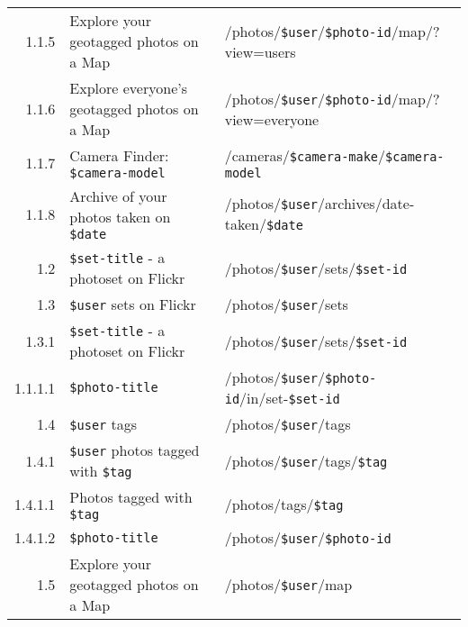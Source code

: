 \documentclass[11pt,a4paper]{article}
\newcommand{\var}[1]{\texttt{\${#1}}}
\begin{document}
\begin{center}
\begin{adjustwidth}{-8em}{-8em}
\begin{small}
\begin{longtable}{r|l|l}
                1.1.5 &
                Explore your geotagged photos on a Map &
                /photos/\var{user}/\var{photo-id}/map/?view=users \\

                1.1.6 &
                Explore everyone's geotagged photos on a Map &
                /photos/\var{user}/\var{photo-id}/map/?view=everyone \\

                1.1.7 &
                Camera Finder: \var{camera-model} &
                /cameras/\var{camera-make}/\var{camera-model} \\

                1.1.8 &
                Archive of your photos taken on \var{date} &
                /photos/\var{user}/archives/date-taken/\var{date} \\

              1.2 &
              \var{set-title} - a photoset on Flickr &
              /photos/\var{user}/sets/\var{set-id} \\

              1.3 &
              \var{user} sets on Flickr &
              /photos/\var{user}/sets \\

                1.3.1 &
                \var{set-title} - a photoset on Flickr &
                /photos/\var{user}/sets/\var{set-id} \\

                  1.1.1.1 &
                  \var{photo-title} &
                  /photos/\var{user}/\var{photo-id}/in/set-\var{set-id} \\

              1.4 &
              \var{user} tags &
              /photos/\var{user}/tags \\

                1.4.1 &
                \var{user} photos tagged with \var{tag} &
                /photos/\var{user}/tags/\var{tag} \\

                  1.4.1.1 &
                  Photos tagged with \var{tag} &
                  /photos/tags/\var{tag} \\

                  1.4.1.2 &
                  \var{photo-title} &
                  /photos/\var{user}/\var{photo-id} \\


              1.5 &
              Explore your geotagged photos on a Map &
              /photos/\var{user}/map \\


\end{longtable}
\end{small}
\end{adjustwidth}
\end{center}
\end{document}
